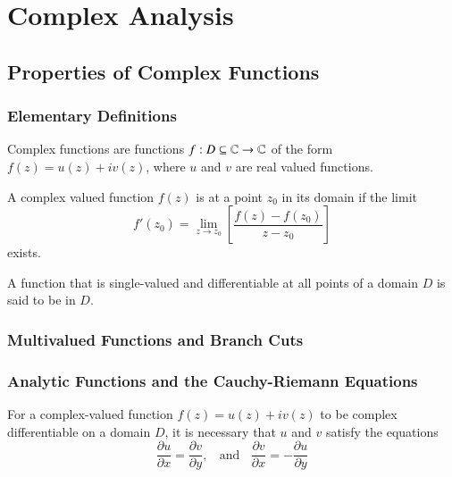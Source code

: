 \documentclass[12pt, a4paper, oneside, openright, titlepage]{book}
\begin{document}
\tableofcontents



\part{Complex Analysis}


\chapter{Properties of Complex Functions}

\section{Elementary Definitions}

Complex functions are functions $f:D\subseteq \mathbb C\rightarrow \mathbb C$ of the form $f(z) = u(z) + iv(z)$, where $u$ and $v$ are real valued functions.

\begin{defn}
    A complex valued function $f(z)$ is  at a point $z_0$ in its domain if the limit \begin{equation*}
        f'(z_0) = \lim\limits_{z\rightarrow z_0}\left[\frac{f(z)-f(z_0)}{z-z_0}\right]
    \end{equation*}
    exists.
\end{defn}

\begin{defn}
    A function that is single-valued and differentiable at all points of a domain $D$ is said to be  in $D$.
\end{defn}




\section{Multivalued Functions and Branch Cuts}


\section{Analytic Functions and the Cauchy-Riemann Equations}

For a complex-valued function $f(z) = u(z)+iv(z)$ to be complex differentiable on a domain $D$, it is necessary that $u$ and $v$ satisfy the  equations \begin{equation*}
    \frac{\partial u}{\partial x} = \frac{\partial v}{\partial y},\;\;\text{ and }\;\;\frac{\partial v}{\partial x} = -\frac{\partial u}{\partial y}
\end{equation*}
\end{document}
